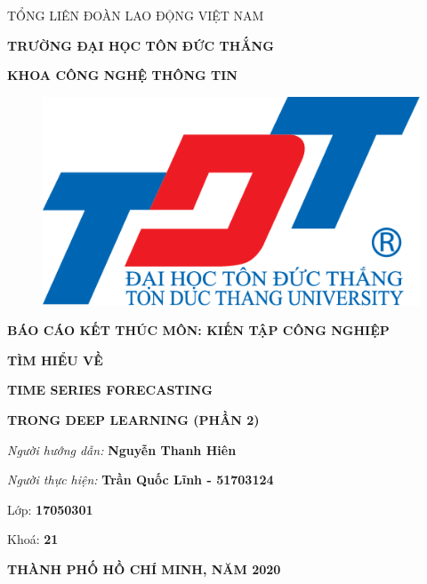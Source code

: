 
\changefontsizes[14pt]{12pt}
\centerline{TỔNG LIÊN ĐOÀN LAO ĐỘNG VIỆT NAM}

\changefontsizes[14pt]{11pt}
\centerline{\textbf{TRƯỜNG ĐẠI HỌC TÔN ĐỨC THẮNG}}
\centerline{\textbf{KHOA CÔNG NGHỆ THÔNG TIN}}

\begin{center}
	\begin{figure}[htp]
		\begin{center}
			\includegraphics[scale=.2]{./images/logo.png}
		\end{center}
	\end{figure}
\end{center}

\changefontsizes{16pt}
\centerline{\textbf{BÁO CÁO KẾT THÚC MÔN: KIẾN TẬP CÔNG NGHIỆP}}
\vspace{1.5cm}
\changefontsizes{24pt}
\centerline{\textbf{TÌM HIỂU VỀ}}
\centerline{\textbf{TIME SERIES FORECASTING}}
\centerline{\textbf{TRONG DEEP LEARNING (PHẦN 2)}}
\vspace{4cm}
\begin{flushright}
	\renewcommand{\baselinestretch}{0.05}
	\changefontsizes{14pt}
	\textit{Người hướng dẫn: }\textbf{Nguyễn Thanh Hiên}
	\setlength{\parskip}{0.5em}
	
	\textit{Người thực hiện: }\textbf{Trần Quốc Lĩnh - 51703124}
	\setlength{\parskip}{0.5em}
	
	Lớp: \textbf{17050301}
	\setlength{\parskip}{0.5em}
	
	Khoá: \textbf{21}
	\setlength{\parskip}{0.5em}
	
\end{flushright}

\vspace{1cm}
\changefontsizes{14pt}
\centerline{\textbf{THÀNH PHỐ HỒ CHÍ MINH, NĂM 2020}}
